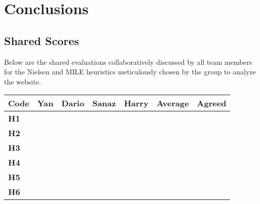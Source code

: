 \section{Conclusions}
\subsection{Shared Scores}
Below are the shared evaluations collaboratively discussed by all team members for the Nielsen and MILE heuristics meticulously chosen by the group to analyze the website.\\
\begin{table}[htp!]
    \centering
    \begin{tabular}{ |l|c|c|c|c|c|c| }
        \hline
        \textbf{Code} & \textbf{Yan} & \textbf{Dario} & \textbf{Sanaz} & \textbf{Harry} & \textbf{Average} & \textbf{Agreed}\\
        \hline
        \textbf{H1} & \textbf{\color{unicefOrange}{3}} & \textbf{\color{unicefOrange}{3}} & \textbf{\color{unicefOrange}{3.5}} & \textbf{\color{unicefRed}{2}} & \textbf{\color{unicefRed}{2.875}} & \textbf{\color{unicefOrange}{3}}\\
        \hline
        \textbf{H2} & \textbf{\color{unicefGreen}{4}} & \textbf{\color{unicefGreen}{5}} & \textbf{\color{unicefGreen}{4}} & \textbf{\color{unicefGreen}{5}} & \textbf{\color{unicefGreen}{4.5}} & \textbf{\color{unicefGreen}{4.5}}\\
        \hline
        \textbf{H3} & \textbf{\color{unicefGreen}{4}} & \textbf{\color{unicefRed}{2}} & \textbf{\color{unicefGreen}{4}} & \textbf{\color{unicefOrange}{3}} & \textbf{\color{unicefOrange}{3.25}} & \textbf{\color{unicefOrange}{3}}\\
        \hline
        \textbf{H4} & \textbf{\color{unicefGreen}{4}} & \textbf{\color{unicefGreen}{5}} & \textbf{\color{unicefGreen}{4}} & \textbf{\color{unicefGreen}{5}} & \textbf{\color{unicefGreen}{4.5}} & \textbf{\color{unicefGreen}{4.5}}\\
        \hline
        \textbf{H5} & \textbf{\color{unicefGreen}{4}} & \textbf{\color{unicefGreen}{4}} & \textbf{\color{unicefGreen}{4.5}} & \textbf{\color{unicefGreen}{5}} & \textbf{\color{unicefGreen}{4.375}} & \textbf{\color{unicefGreen}{4.5}}\\
        \hline
        \textbf{H6} & \textbf{\color{unicefGreen}{4}} & \textbf{\color{unicefGreen}{5}} & \textbf{\color{unicefGreen}{4.5}} & \textbf{\color{unicefGreen}{4}} & \textbf{\color{unicefGreen}{4.375}} & \textbf{\color{unicefGreen}{5}}\\

\end{tabular}
\end{table}
